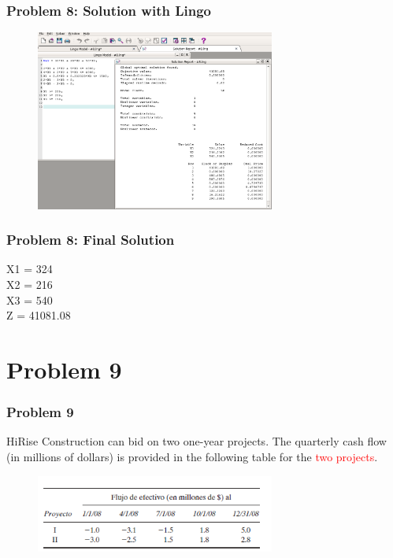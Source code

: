 \documentclass[10pt,svgnames,fragile]{beamer}
\begin{document}
\begin{frame}[label={sec:orge9abdcb}]{}

\frametitle{Problem 8: Solution with Lingo }
\begin{figure}
\includegraphics[width=0.7\textwidth]{images/8.png}
\end{figure}


\end{frame}


\begin{frame}[label={sec:org9c62e72}]{}
\frametitle{Problem 8: Final Solution}

X1 = 324\\
X2 = 216\\
X3 = 540\\
Z = 41081.08
\end{frame}


\section{Problem 9}
\label{sec:org92dd686}

\begin{frame}
\frametitle{Problem 9}


HiRise Construction can bid on two one-year projects. The quarterly cash flow (in millions of dollars) is provided in the following table for the \textcolor{red}{two projects}.
\begin{figure}
\includegraphics[width=0.7\textwidth]{images/io7.PNG}
\end{figure}
\end{frame}
\end{document}
